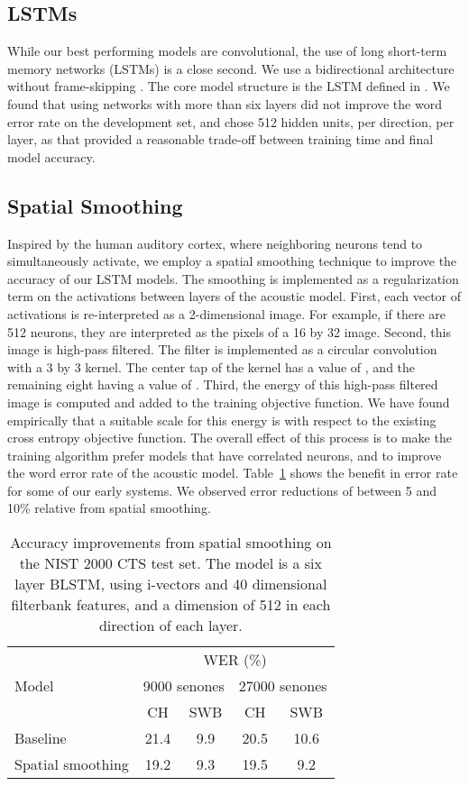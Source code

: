 \documentclass{article}
\begin{document}
\subsection{LSTMs}
While our best performing models are convolutional, the
use of long short-term memory networks (LSTMs) is a close second. We use a 
bidirectional architecture \cite{graves2005framewise} without frame-skipping
\cite{sak2015fast}. The core model structure is the LSTM defined in 
\cite{sak2014long}. We found that using networks with more than six
layers did not improve the word error rate on the development set,
and chose 512 hidden units, per direction, per layer, as that provided a 
reasonable trade-off between training time and final model accuracy.
\subsection{Spatial Smoothing}
Inspired by the human auditory cortex, where neighboring neurons tend to simultaneously activate, we employ a spatial smoothing technique to improve the accuracy of our LSTM models.
The smoothing is implemented as a regularization term on the activations between layers of the acoustic model.
First, each vector of activations is re-interpreted as a 2-dimensional image. For example, if there are 512 neurons, they are interpreted as the pixels of a 16 by 32 image.
Second, this image is high-pass filtered. The filter is implemented as a circular convolution with a 3 by 3 kernel. The center tap of the kernel has a value of , and the remaining eight having a value of .
Third, the energy of this high-pass filtered image is computed and added to the training objective function. We have found empirically that a suitable scale for this energy is  with respect to the existing cross entropy objective function.
The overall effect of this process is to make the training algorithm prefer models that have correlated neurons, and to improve the word error rate of the acoustic model.
Table~\ref{tab:spatialsmoothing} shows the benefit in error rate for some of our early systems.
We observed error reductions of between 5 and 10\% relative from spatial smoothing.
\begin{table}[t]
    \centering
\caption{Accuracy improvements from spatial smoothing on the NIST 2000 CTS test set.
The model is a six layer BLSTM, using i-vectors and 40 dimensional filterbank features, and a dimension of 512 in each direction of each layer.}
\label{tab:spatialsmoothing}
\vspace*{0.1in}
    \begin{tabular}{|l|c|c|c|c|}
    \hline 
	\multirow{3}{*}{Model} & \multicolumn{4}{c|}{WER (\%)}	\\ 
				\cline{2-5}
				& \multicolumn{2}{c|}{9000 senones} & \multicolumn{2}{c|}{27000 senones} \\
				\cline{2-5}
				& CH	& SWB	& CH	& SWB	\\ \hline
	Baseline       		& 21.4	& 9.9	& 20.5	& 10.6	\\ \hline
	Spatial smoothing    	& 19.2	& 9.3	& 19.5	& 9.2	\\ \hline
    	\end{tabular}
\end{table}
\end{document}
